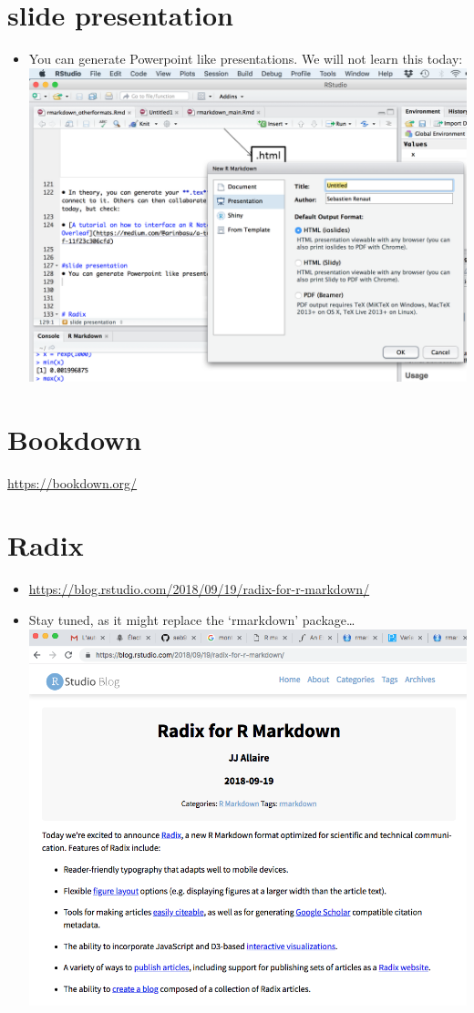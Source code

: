 \documentclass[]{article}
\providecommand{\tightlist}{%
  \setlength{\itemsep}{0pt}\setlength{\parskip}{0pt}}
\begin{document}
\section{slide presentation}\label{slide-presentation}

\begin{itemize}
\tightlist
\item
  You can generate Powerpoint like presentations. We will not learn this
  today: \includegraphics[width=5.20833in]{../figures/slides.png}
\end{itemize}

\section{Bookdown}\label{bookdown}

\url{https://bookdown.org/}

\section{Radix}\label{radix}

\begin{itemize}
\item
  \url{https://blog.rstudio.com/2018/09/19/radix-for-r-markdown/}
\item
  Stay tuned, as it might replace the `rmarkdown' package\ldots{}\\
  \includegraphics[width=5.20833in]{../figures/radix.png}
\end{itemize}
\end{document}
